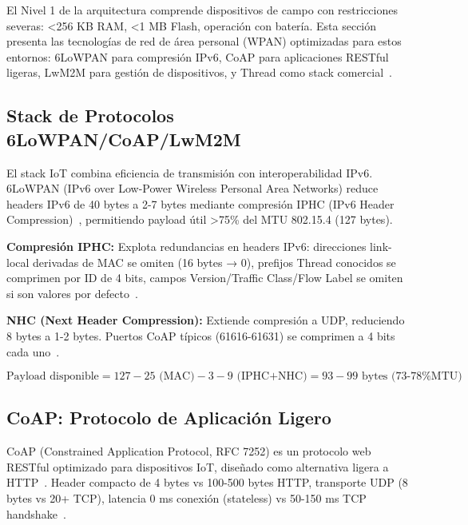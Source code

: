El Nivel 1 de la arquitectura comprende dispositivos de campo con restricciones severas: <256 KB RAM, <1 MB Flash, operación con batería. Esta sección presenta las tecnologías de red de área personal (WPAN) optimizadas para estos entornos: 6LoWPAN para compresión IPv6, CoAP para aplicaciones RESTful ligeras, LwM2M para gestión de dispositivos, y Thread como stack comercial~\cite{shelby6LoWPANWirelessEmbedded2009,abdulsalamOverviewRecentWireless2024}.

\subsection{Stack de Protocolos 6LoWPAN/CoAP/LwM2M}

El stack IoT combina eficiencia de transmisión con interoperabilidad IPv6. 6LoWPAN (IPv6 over Low-Power Wireless Personal Area Networks) reduce headers IPv6 de 40 bytes a 2-7 bytes mediante compresión IPHC (IPv6 Header Compression)~\cite{shelby6LoWPANWirelessEmbedded2009}, permitiendo payload útil >75\% del MTU 802.15.4 (127 bytes).

\textbf{Compresión IPHC:} Explota redundancias en headers IPv6: direcciones link-local derivadas de MAC se omiten (16 bytes → 0), prefijos Thread conocidos se comprimen por ID de 4 bits, campos Version/Traffic Class/Flow Label se omiten si son valores por defecto~\cite{shelby6LoWPANWirelessEmbedded2009}.

\textbf{NHC (Next Header Compression):} Extiende compresión a UDP, reduciendo 8 bytes a 1-2 bytes. Puertos CoAP típicos (61616-61631) se comprimen a 4 bits cada uno~\cite{shelby6LoWPANWirelessEmbedded2009}.

\begin{equation}
\text{Payload disponible} = 127 - 25 \text{ (MAC)} - 3{-}9 \text{ (IPHC+NHC)} = 93{-}99 \text{ bytes (73-78\% MTU)}
\end{equation}

\subsection{CoAP: Protocolo de Aplicación Ligero}

CoAP (Constrained Application Protocol, RFC 7252) es un protocolo web RESTful optimizado para dispositivos IoT, diseñado como alternativa ligera a HTTP~\cite{shahinzadehSmartHomeConnectivity2024}. Header compacto de 4 bytes vs 100-500 bytes HTTP, transporte UDP (8 bytes vs 20+ TCP), latencia 0 ms conexión (stateless) vs 50-150 ms TCP handshake~\cite{karimiIIoTCommunicationProtocols2025}.

